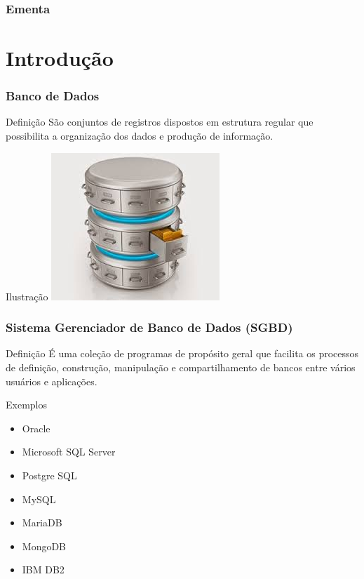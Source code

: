 \documentclass{beamer}
\begin{document}
\begin{frame}
	\frametitle{Ementa}
  	\tableofcontents
\end{frame}


\section{Introdução}

\begin{frame}
\frametitle{Banco de Dados}

\begin{block}{Definição}
	São conjuntos de registros dispostos em estrutura regular que possibilita a
	organização dos dados e produção de informação.
\end{block}\vfill

\begin{exampleblock}{Ilustração}
	\centering
	\includegraphics[scale=0.4]{img/banco_de_dados}
\end{exampleblock}
\end{frame}

\begin{frame}
\frametitle{Sistema Gerenciador de Banco de Dados (SGBD)}

\begin{block}{Definição}
É uma coleção de programas de propósito geral que facilita os processos de
definição, construção, manipulação e compartilhamento de bancos entre
vários usuários e aplicações.
\end{block} \vfill

\begin{exampleblock}{Exemplos}
\begin{itemize}
\item Oracle
\item Microsoft SQL Server
\item Postgre SQL
\item MySQL
\item MariaDB
\item MongoDB
\item IBM DB2
\end{itemize}
\end{exampleblock}

\end{frame}
\end{document}
